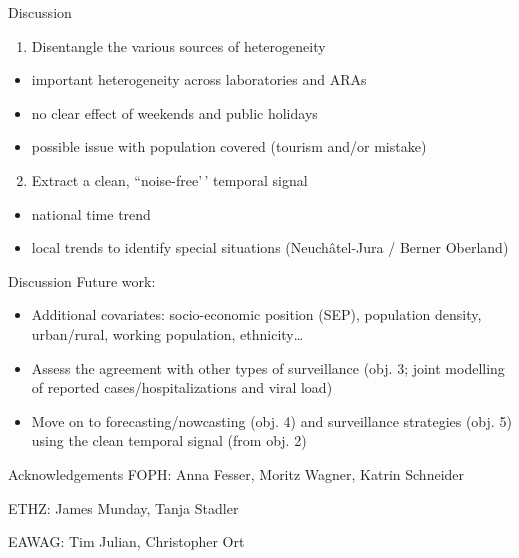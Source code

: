 \documentclass[
  ignorenonframetext,
]{beamer}
\providecommand{\tightlist}{%
  \setlength{\itemsep}{0pt}\setlength{\parskip}{0pt}}
\begin{document}
\begin{frame}{Discussion}
\protect\hypertarget{discussion}{}
\begin{enumerate}
\tightlist
\item
  Disentangle the \alert{various sources of heterogeneity}
\end{enumerate}

\begin{itemize}
\item
  important heterogeneity across \alert{laboratories} and \alert{ARAs}
\item
  no clear effect of weekends and public holidays
\item
  possible issue with \alert{population} covered (tourism and/or
  mistake) \pause\bigskip
\end{itemize}

\begin{enumerate}
\setcounter{enumi}{1}
\tightlist
\item
  Extract a clean, ``noise-free'\,' \alert{temporal signal}
\end{enumerate}

\begin{itemize}
\item
  national time trend
\item
  local trends to identify special situations (Neuchâtel-Jura / Berner
  Oberland)
\end{itemize}
\end{frame}

\begin{frame}{Discussion}
\protect\hypertarget{discussion-1}{}
Future work:

\begin{itemize}
\item
  Additional \alert{covariates}: socio-economic position (SEP),
  population density, urban/rural, working population, ethnicity\ldots{}
  \pause
\item
  Assess the \alert{agreement} with other types of surveillance (obj. 3;
  joint modelling of reported cases/hospitalizations and viral load)
  \pause
\item
  Move on to \alert{forecasting/nowcasting} (obj. 4) and
  \alert{surveillance strategies} (obj. 5) using the clean temporal
  signal (from obj. 2)
\end{itemize}
\end{frame}

\begin{frame}{Acknowledgements}
\protect\hypertarget{acknowledgements}{}
FOPH: Anna Fesser, Moritz Wagner, Katrin Schneider

ETHZ: James Munday, Tanja Stadler

EAWAG: Tim Julian, Christopher Ort
\end{frame}
\end{document}

